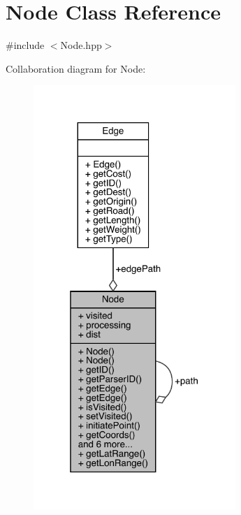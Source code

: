 \hypertarget{class_node}{}\section{Node Class Reference}
\label{class_node}


{\ttfamily \#include $<$Node.\+hpp$>$}



Collaboration diagram for Node\+:
\nopagebreak
\begin{figure}[H]
\begin{center}
\leavevmode
\includegraphics[width=217pt]{class_node__coll__graph}
\end{center}
\end{figure}

